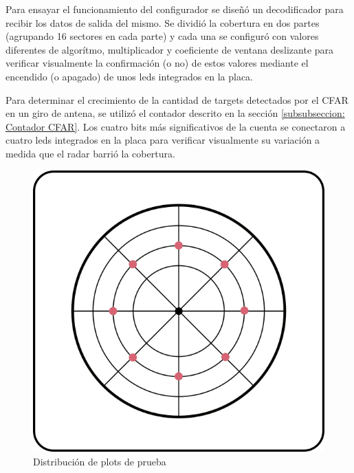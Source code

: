 Para ensayar el funcionamiento del configurador se diseñó un decodificador para recibir los datos de salida del mismo. Se dividió la cobertura en dos partes (agrupando 16 sectores en cada parte) y cada una se configuró con valores diferentes de algorítmo, multiplicador y coeficiente de ventana deslizante para verificar visualmente la confirmación (o no) de estos valores mediante el encendido (o apagado) de unos leds integrados en la placa.

Para determinar el crecimiento de la cantidad de targets detectados por el CFAR en un giro de antena, se utilizó el contador descrito en la sección \ref{subsubseccion: Contador CFAR}. Los cuatro bits más significativos de la cuenta se conectaron a cuatro leds integrados en la placa para verificar visualmente su variación a medida que el radar barrió la cobertura.

\begin{figure}
\centering
\includegraphics[scale=0.5]{./Figures/plots_simulador.png}
\caption{Distribución de plots de prueba}
\label{fig: plots simulador}
\end{figure}


